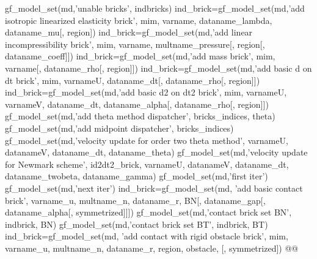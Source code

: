 \begin{synopsis}
gf_model_set(md,'unable bricks',  \tivec indbricks)
ind_brick=gf_model_set(md,'add isotropic linearized elasticity brick', \tmim mim, \tstr varname, \tstr dataname_lambda, \tstr dataname_mu[, \tint region])
ind_brick=gf_model_set(md,'add linear incompressibility brick', \tmim mim, \tstr varname, \tstr multname_pressure[, \tint region[, \tstr dataname_coeff]])
ind_brick=gf_model_set(md,'add mass brick', \tmim mim, \tstr varname[, \tstr dataname_rho[, \tint region]])
ind_brick=gf_model_set(md,'add basic d on dt brick', \tmim mim, \tstr varnameU,  \tstr dataname_dt[, \tstr dataname_rho[, \tint region]])
ind_brick=gf_model_set(md,'add basic d2 on dt2 brick', \tmim mim, \tstr varnameU,  \tstr varnameV, \tstr dataname_dt, \tstr dataname_alpha[, \tstr dataname_rho[, \tint region]])
gf_model_set(md,'add theta method dispatcher', \tivec bricks_indices, \tstr theta)
gf_model_set(md,'add midpoint dispatcher', \tivec bricks_indices)
gf_model_set(md,'velocity update for order two theta method',  \tstr varnameU,  \tstr datanameV, \tstr dataname_dt, \tstr dataname_theta)
gf_model_set(md,'velocity update for Newmark scheme',  \tint id2dt2_brick, \tstr varnameU,  \tstr datanameV, \tstr dataname_dt, \tstr dataname_twobeta,  \tstr dataname_gamma)
gf_model_set(md,'first iter')
gf_model_set(md,'next iter')
ind_brick=gf_model_set(md, 'add basic contact brick', \tstr varname_u, \tstr multname_n, \tstr dataname_r, \tmat BN[, \tstr dataname_gap[, \tstr dataname_alpha[, \tint symmetrized]]])
gf_model_set(md,'contact brick set BN', \tint indbrick, \tmat BN)
gf_model_set(md,'contact brick set BT', \tint indbrick, \tmat BT)
ind_brick=gf_model_set(md, 'add contact with rigid obstacle brick', \tmim mim, \tstr varname_u, \tstr multname_n, \tstr dataname_r, \tint region, \tstr obstacle, [,  \tint symmetrized])
@@
\end{synopsis}
